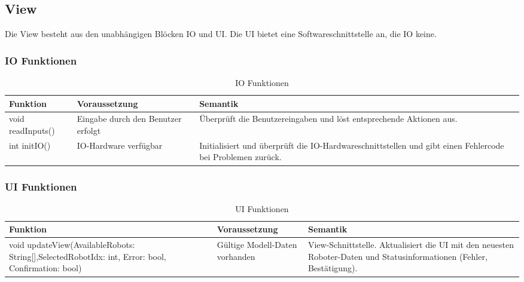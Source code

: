 \clearpage
\subsection{View}
Die View besteht aus den unabhängigen Blöcken IO und UI. Die UI bietet eine Softwareschnittstelle an, die IO keine.

\subsubsection{IO Funktionen}
\begin{table}[h!]
    \centering
    \begin{tabular}{|p{5cm}|p{5cm}|p{5cm}|}
        \hline
        \textbf{Funktion} & \textbf{Voraussetzung} & \textbf{Semantik} \\
        \hline
        void readInputs() & Eingabe durch den Benutzer erfolgt & Überprüft die Benutzereingaben und löst entsprechende Aktionen aus. \\
        \hline
        int initIO() & IO-Hardware verfügbar & Initialisiert und überprüft die IO-Hardwareschnittstellen und gibt einen Fehlercode bei Problemen zurück. \\
        \hline
    \end{tabular}
    \caption{IO Funktionen}
    \label{tab:IOFunktionen}
\end{table}

\subsubsection{UI Funktionen}
\begin{table}[h!]
    \centering
    \begin{tabular}{|p{5cm}|p{5cm}|p{5cm}|}
        \hline
        \textbf{Funktion} & \textbf{Voraussetzung} & \textbf{Semantik} \\
        \hline
        void updateView(AvailableRobots: String[],SelectedRobotIdx: int, Error: bool, Confirmation: bool) & Gültige Modell-Daten vorhanden & View-Schnittstelle. Aktualisiert die UI mit den neuesten Roboter-Daten und Statusinformationen (Fehler, Bestätigung). \\ 
        \hline
    \end{tabular}
    \caption{UI Funktionen}
    \label{tab:UIFunktionen}
\end{table}









